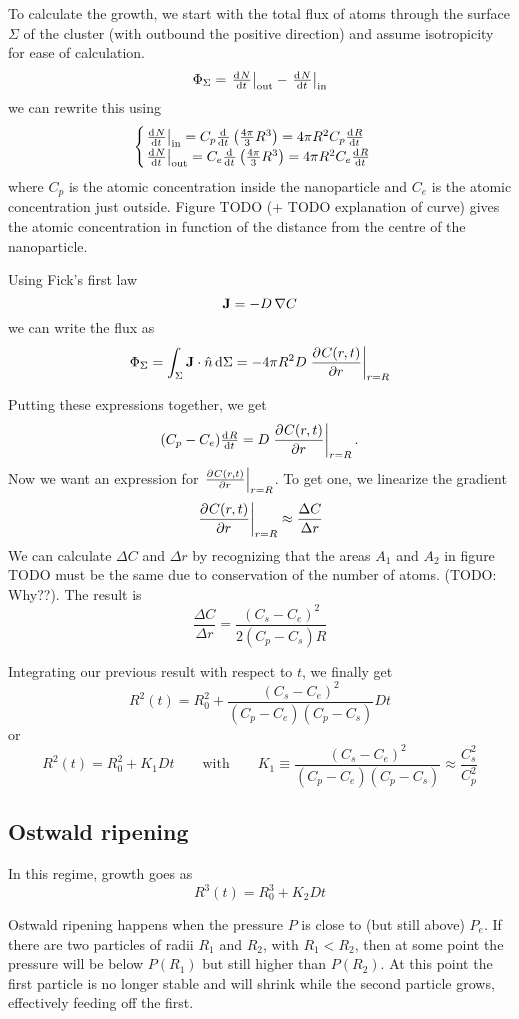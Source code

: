 To calculate the growth, we start with the total flux of atoms through the surface $\Sigma$ of the cluster (with outbound the positive direction) and assume isotropicity for ease of calculation.
\[ \Phi_\Sigma = \left.\od{N}{t}\right|_{\text{out}} - \left.\od{N}{t}\right|_{\text{in}} \]
we can rewrite this using
\[ \begin{cases}
\left.\od{N}{t}\right|_{\text{in}} = C_p \od{}{t}\left(\frac{4\pi}{3}R^3\right) = 4\pi R^2 C_p \od{R}{t} \\
\left.\od{N}{t}\right|_{\text{out}} = C_e \od{}{t}\left(\frac{4\pi}{3}R^3\right) = 4\pi R^2 C_e \od{R}{t} 
\end{cases} \]
where $C_p$ is the atomic concentration inside the nanoparticle and $C_e$ is the atomic concentration just outside. Figure TODO (+ TODO explanation of curve) gives the atomic concentration in function of the distance from the centre of the nanoparticle.

Using Fick's first law
\[ \bm{\mathrm{J}} = - D \mathop{}\! \nabla C \]
we can write the flux as
\[ \Phi_\Sigma = \int_\Sigma \bm{\mathrm{J}}\cdot \hat{n}\operatorname{d \!}{\Sigma} = - 4\pi R^2 D \left. \frac{\partial{^{}}C(r,t)}{\partial{{r}^{}}} \right|_{r=R} \]

Putting these expressions together, we get
\[ (C_p - C_e)\od{R}{t} = D \left.\pd{C(r,t)}{r}\right|_{r=R}. \]
Now we want an expression for $\left. \frac{\partial{^{}}C(r,t)}{\partial{{r}^{}}} \right|_{r=R}$. To get one, we linearize the gradient
\[ \left. \frac{\partial{^{}}C(r,t)}{\partial{{r}^{}}} \right|_{r=R} \approx \frac{\Delta C}{\Delta r}\]
We can calculate $\Delta C$ and $\Delta r$ by recognizing that the areas $A_1$ and $A_2$ in figure TODO must be the same due to conservation of the number of atoms. (TODO: Why??). The result is
\[ \frac{\Delta C}{\Delta r} = \frac{(C_s - C_e)^2}{2(C_p - C_s)R} \]

Integrating our previous result with respect to $t$, we finally get
\[ R^2(t) = R_0^2 + \frac{(C_s-C_e)^2}{(C_p-C_e)(C_p-C_s)}Dt \]
or
\[ R^2(t) = R_0^2 + K_1Dt \qquad \text{with} \qquad K_1 \equiv \frac{(C_s-C_e)^2}{(C_p-C_e)(C_p-C_s)} \approx \frac{C_s^2}{C_p^2} \]

\subsection{Ostwald ripening}
In this regime, growth goes as
\[ R^3(t) = R_0^3 + K_2 Dt \]

Ostwald ripening happens when the pressure $P$ is close to (but still above) $P_e$. If there are two particles of radii $R_1$ and $R_2$, with $R_1 < R_2$, then at some point the pressure will be below $P(R_1)$ but still higher than $P(R_2)$. At this point the first particle is no longer stable and will shrink while the second particle grows, effectively feeding off the first.

